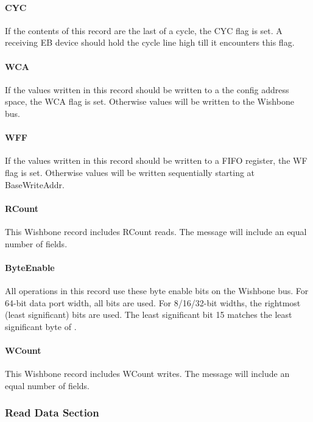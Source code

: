 \documentclass{article}
\begin{document}
\paragraph{CYC} \label{field:CYC}
If the contents of this record are the last of a cycle,
the CYC flag is set.
A receiving EB device should hold the cycle line high till it encounters this flag.

\paragraph{WCA} \label{field:WCA}
If the values written in this record should be written to a the config
address space, the WCA flag is set.
Otherwise values will be written to the Wishbone bus.

\paragraph{WFF} \label{field:WFF}
If the values written in this record should be written to a FIFO register,
the WF flag is set.
Otherwise values will be written sequentially starting at BaseWriteAddr.

\paragraph{RCount} \label{field:RCount}
This Wishbone record includes RCount reads.
The message will include an equal number of  fields.

\paragraph{ByteEnable} \label{field:ByteEnable}
All operations in this record use these byte enable bits on the Wishbone bus.
For 64-bit data port width, all bits are used.
For 8/16/32-bit widths, the rightmost (least significant) bits are used.
The least significant bit 15 matches the least significant byte of .

\paragraph{WCount} \label{field:WCount}
This Wishbone record includes WCount writes.
The message will include an equal number of  fields.

\subsubsection{Read Data Section}
\end{document}
